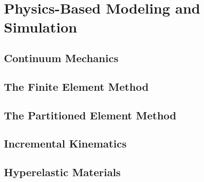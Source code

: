 \chapter{Physics-Based Modeling and Simulation}
%
\section{Continuum Mechanics}
\label{Continuum Mechanics}
\section{The Finite Element Method}
\label{The Finite Element Method}

\section{The Partitioned Element Method}
\label{The Partitioned Element Method}

\section{Incremental Kinematics}
\label{Incremental Kinematics}

\section{Hyperelastic Materials}
\label{Hyperelastic Materials}

